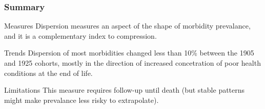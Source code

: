 \documentclass[20pt]{beamer}
\begin{document}
\begin{frame}
\frametitle{Summary}
\begin{block}{Measures}
Dispersion measures an aspect of the shape of morbidity prevalance, and it is a
complementary index to compression. 
\end{block}
\pause
\begin{block}{Trends}
Dispersion of most morbidities changed less than 10\% between the 1905 and 1925
cohorts, mostly in the direction of increased concetration of poor health
conditions at the end of life.
\end{block}
\pause
\begin{block}{Limitations}
This measure requires follow-up until death (but stable patterns might make
prevalance less risky to extrapolate). 
\end{block}
\end{frame}

\end{document}
